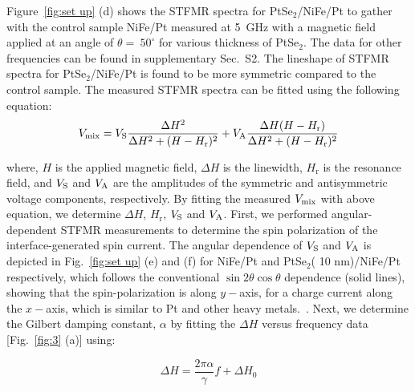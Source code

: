 \documentclass[journal=jacsat,manuscript=article]{achemso}
\begin{document}
Figure~\ref{fig:set up} (d) shows the STFMR spectra for PtSe$_2$/NiFe/Pt to gather with the control sample NiFe/Pt measured at 5~GHz with a magnetic field applied at an angle of $\theta =~50^{\circ}$ for various thickness of PtSe$_2$. The data for other frequencies can be found in supplementary Sec.~S2. The lineshape of STFMR spectra for PtSe$_2$/NiFe/Pt is found to be more symmetric compared to the control sample. The measured STFMR spectra can be fitted using the following equation:~\cite{liu2011spin,kumar2021large}
\begin{equation}\label{Vmix}
 V_{\rm{mix}}=V_{\rm S}\frac{\Delta H^2}{\Delta H^2+(H-H_\mathrm{r})^2}+V_{\rm A}\frac{\Delta H({H-H_\mathrm{r}})}{\Delta H^2+(H-H_\mathrm{r})^2}
\end{equation}

where, $H$ is the applied magnetic field, $\Delta H$ is the linewidth, %
$H_\mathrm{r}$ is the resonance field, %
and $V_{\rm S}$ and $V_{\rm A}$ are the amplitudes of the symmetric and antisymmetric voltage components, respectively. %
By fitting the measured $V_{\rm mix}$ with above equation, we determine ${\Delta H}$, $H_\mathrm{r}$, $V_{\rm S}$ and $V_{\rm A}$. First, we performed angular-dependent STFMR measurements to determine the spin polarization of the interface-generated spin current. The angular dependence of $V_{\rm S}$ and $V_{\rm A}$ is depicted in Fig.~\ref{fig:set up} (e) and (f) for NiFe/Pt and PtSe$_2$( 10 nm)/NiFe/Pt respectively, which follows the conventional $\sin2\theta\cos\theta$ dependence (solid lines), showing that the spin-polarization is along $y-$axis, for a charge current along the $x-$axis, which is similar to Pt and other heavy metals.~\cite{liu2011spin,macneill2017control}. Next, we determine the Gilbert damping constant, $\alpha$ by fitting the ${\Delta H}$ versus frequency data [Fig.~\ref{fig:3} (a)] using:\cite{liu2011spin,kumar2021large}

\begin{equation}\label{LW}
 \Delta H=\frac{2\pi\alpha}{\gamma}f+\Delta H_0
\end{equation}
\end{document}
